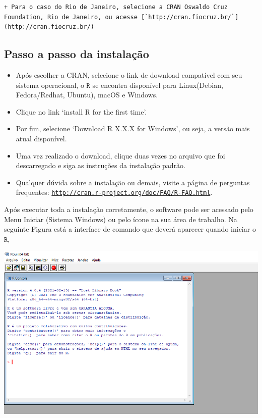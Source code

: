 \documentclass[
]{book}
\begin{document}
\begin{verbatim}
+ Para o caso do Rio de Janeiro, selecione a CRAN Oswaldo Cruz Foundation, Rio de Janeiro, ou acesse [`http://cran.fiocruz.br/`](http://cran.fiocruz.br/)
\end{verbatim}

\hypertarget{passo-a-passo-da-instalauxe7uxe3o}{%
\subsection{Passo a passo da instalação}\label{passo-a-passo-da-instalauxe7uxe3o}}

\begin{itemize}
\item
  Após escolher a CRAN, selecione o link de download compatível com seu sistema operacional, o \(\texttt{R}\) se encontra disponível para Linux(Debian, Fedora/Redhat, Ubuntu), macOS e Windows.
\item
  Clique no link `install R for the first time'.
\item
  Por fim, selecione `Download R X.X.X for Windows', ou seja, a versão mais atual disponível.
\item
  Uma vez realizado o download, clique duas vezes no arquivo que foi descarregado e siga as instruções da instalação padrão.
\item
  Qualquer dúvida sobre a instalação ou demais, visite a página de perguntas frequentes: \href{http://cran.r-project.org/doc/FAQ/R-FAQ.html}{\texttt{http://cran.r-project.org/doc/FAQ/R-FAQ.html}}.
\end{itemize}

Após executar toda a instalação corretamente, o software pode ser acessado pelo Menu Iniciar (Sistema Windows) ou pelo ícone na sua área de trabalho. Na seguinte Figura está a interface de comando que deverá aparecer quando iniciar o \(\texttt{R}\),

\begin{center}\includegraphics{R_interface} \end{center}
\end{document}
